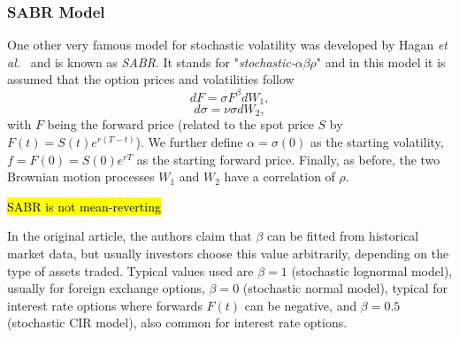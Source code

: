 \subsubsection{SABR Model}
One other very famous model for stochastic volatility was developed by Hagan \textit{et al.}~\cite{Hagan} and is known as \emph{SABR}. It stands for "\emph{stochastic-}$\alpha\beta\rho$" and in this model it is assumed that the option prices and volatilities follow
\begin{equation}\label{dF}
dF=\sigma F^\beta dW_1,
\end{equation}
\begin{equation}\label{dsigma}
d\sigma=\nu\sigma dW_2,
\end{equation}
\noindent with $F$ being the forward price (related to the spot price $S$ by $F(t)=S(t)e^{r(T-t)}$).
We further define $\alpha=\sigma(0)$ as the starting volatility, $f=F(0)=S(0)e^{rT}$ as the starting forward price. Finally, as before, the two Brownian motion processes $W_1$ and $W_2$ have a correlation of $\rho$.

\iffalse
It should be noted that we are now using the \hl{forward measure}, so in eq.\eqref{dF} we use $F$, the \emph{forward price}, instead of the usual spot price $S$ from eq.  \ref{GBM}. These two quantities are related by $S(t)=e^{-r(T-t)}F(t)$, so we can easily obtain one from the other.
\fi

\hl{SABR is not mean-reverting}

In the original article, the authors claim that $\beta$ can be fitted from historical market data, but usually investors choose this value arbitrarily, depending on the type of assets traded. Typical values used are $\beta=1$ (stochastic lognormal model), usually for foreign exchange options, $\beta=0$ (stochastic normal model), typical for interest rate options where forwards $F(t)$ can be negative, and $\beta=0.5$ (stochastic CIR model), also common for interest rate options.


